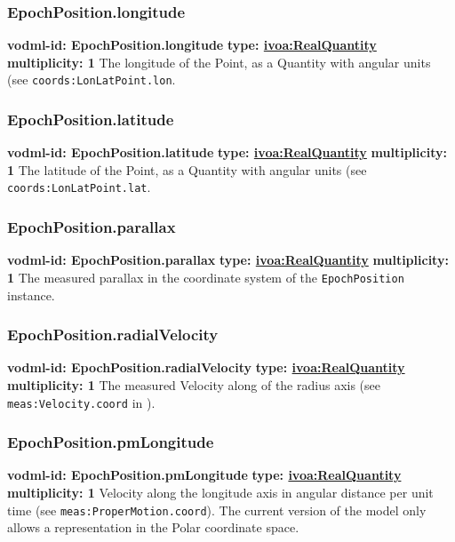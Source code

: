    \subsubsection{EpochPosition.longitude}
    \textbf{vodml-id: EpochPosition.longitude} \newline
    \textbf{type: \hyperref[sect:ivoa]{ivoa:RealQuantity}} \newline
    \textbf{multiplicity: 1} \newline
    The longitude of the Point, as a Quantity with angular units (see \texttt{coords:LonLatPoint.lon}.

    \subsubsection{EpochPosition.latitude}
    \textbf{vodml-id: EpochPosition.latitude} \newline
    \textbf{type: \hyperref[sect:ivoa]{ivoa:RealQuantity}} \newline
    \textbf{multiplicity: 1} \newline
    The latitude of the Point, as a Quantity with angular units (see \texttt{coords:LonLatPoint.lat}.

    \subsubsection{EpochPosition.parallax}
    \textbf{vodml-id: EpochPosition.parallax} \newline
    \textbf{type: \hyperref[sect:ivoa]{ivoa:RealQuantity}} \newline
    \textbf{multiplicity: 1} \newline
    The measured parallax in the coordinate system of the \texttt{EpochPosition} instance.

    \subsubsection{EpochPosition.radialVelocity}
    \textbf{vodml-id: EpochPosition.radialVelocity} \newline
    \textbf{type: \hyperref[sect:ivoa]{ivoa:RealQuantity}} \newline
    \textbf{multiplicity: 1} \newline
    The measured Velocity along of the radius axis (see \texttt{meas:Velocity.coord} in \cite{2022ivoa.spec.1004R}).

    \subsubsection{EpochPosition.pmLongitude}
    \textbf{vodml-id: EpochPosition.pmLongitude} \newline
    \textbf{type: \hyperref[sect:ivoa]{ivoa:RealQuantity}} \newline
    \textbf{multiplicity: 1} \newline
    Velocity along the longitude axis in angular distance per unit time (see \texttt{meas:ProperMotion.coord}). The current version of the model only allows a representation in the Polar coordinate space.

